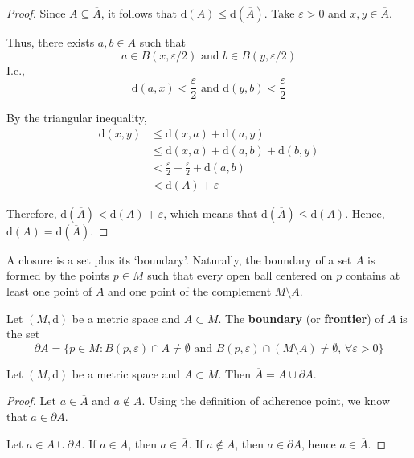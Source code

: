 \begin{proof}
    Since $A \subseteq \overline{A}$, it follows that $\mathrm{d}(A) \leq \mathrm{d}(\overline{A})$. Take $\varepsilon > 0$ and $x, y \in \overline{A}$.

    Thus, there exists $a, b \in A$ such that 
    \[
        a \in B(x, \varepsilon/2) \text{ and } b \in B(y, \varepsilon/2)
    \]
    I.e.,
    \[
        \mathrm{d}(a,x) < \frac{\varepsilon}{2} \text{ and } \mathrm{d}(y,b) < \frac{\varepsilon}{2}
    \]

    By the triangular inequality,
    \begin{equation*}
        \begin{aligned}
            \mathrm{d}(x,y) &\leq \mathrm{d}(x,a) + \mathrm{d}(a,y) \\
            &\leq \mathrm{d}(x,a) + \mathrm{d}(a,b) + \mathrm{d}(b,y) \\
            &< \frac{\varepsilon}{2} + \frac{\varepsilon}{2} + \mathrm{d}(a,b) \\
            &< \mathrm{d}(A) + \varepsilon
        \end{aligned}
    \end{equation*}

    Therefore, $\mathrm{d}(\overline{A}) < \mathrm{d}(A) + \varepsilon$, which means that $\mathrm{d}(\overline{A}) \leq \mathrm{d}(A)$. Hence, $\mathrm{d}(A) = \mathrm{d}(\overline{A})$.
\end{proof}

A closure is a set plus its `boundary'. Naturally, the boundary of a set $A$ is formed by the points $p \in M$ such that every open ball centered on $p$ contains at least one point of $A$ and one point of the complement $M \setminus A$.

\begin{definition}[Boundary]
    Let $(M, \mathrm{d})$ be a metric space and $A \subset M$. The \textbf{boundary} (or \textbf{frontier}) of $A$ is the set
    \[
        \partial A = \{ p \in M : B(p, \varepsilon) \cap A \neq \emptyset \text{ and } B(p, \varepsilon) \cap (M \setminus A) \neq \emptyset, \, \forall \varepsilon > 0 \}
    \]
\end{definition}

\begin{proposition}
    Let $(M, \mathrm{d})$ be a metric space and $A \subset M$. Then $\overline{A} = A \cup \partial A$.
\end{proposition}

\begin{proof}
    Let $a \in \overline{A}$ and $a \notin A$. Using the definition of adherence point, we know that $a \in \partial A$.

    Let $a \in A \cup \partial A$. If $a \in A$, then $a \in \overline{A}$. If $a \notin A$, then $a \in \partial A$, hence $a \in \overline{A}$.
\end{proof}

